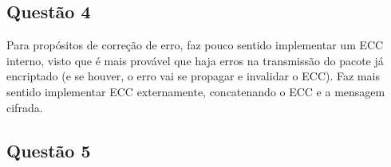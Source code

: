\documentclass{article}
\begin{document}
\subsection*{Questão 4}

Para propósitos de correção de erro, faz pouco sentido implementar um ECC interno, visto que é mais provável que haja erros na transmissão do pacote já encriptado (e se houver, o erro vai se propagar e invalidar o ECC). Faz mais sentido implementar ECC externamente, concatenando o ECC e a mensagem cifrada.

\subsection*{Questão 5}
\end{document}
